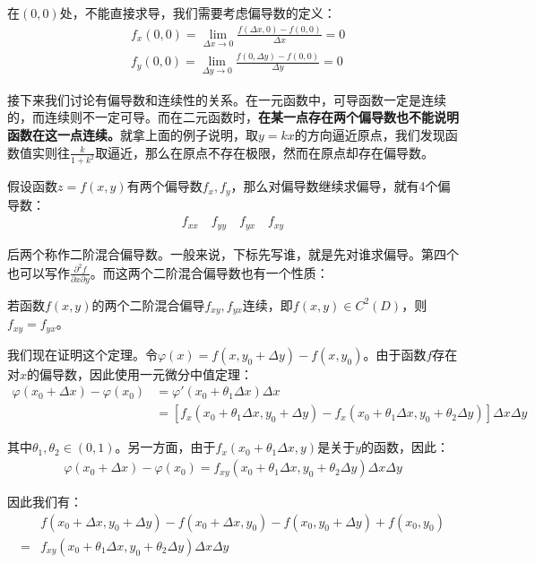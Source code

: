 \documentclass{ctexart}
\let\oldtextbf\textbf %
\renewcommand{\textbf}[1]{\textcolor{btex}{\oldtextbf{#1}}} %
\begin{document}
在$(0,0)$处，不能直接求导，我们需要考虑偏导数的定义：
\begin{align*}
    &f_x(0,0)=\lim_{\Delta x\to 0}\frac{f(\Delta x,0)-f(0,0)}{\Delta x}=0\\
    &f_y(0,0)=\lim_{\Delta y\to 0}\frac{f(0,\Delta y)-f(0,0)}{\Delta y}=0
\end{align*}

接下来我们讨论有偏导数和连续性的关系。在一元函数中，可导函数一定是连续的，而连续则不一定可导。而在二元函数时，\textbf{在某一点存在两个偏导数也不能说明函数在这一点连续。}就拿上面的例子说明，取$y=kx$的方向逼近原点，我们发现函数值实则往$\frac{k}{1+k^2}$取逼近，那么在原点不存在极限，然而在原点却存在偏导数。

假设函数$z=f(x,y)$有两个偏导数$f_x,f_y$，那么对偏导数继续求偏导，就有4个偏导数：
\begin{align*}
    f_{xx}\quad f_{yy}\quad f_{yx}\quad f_{xy}
\end{align*}

后两个称作二阶混合偏导数。一般来说，下标先写谁，就是先对谁求偏导。第四个也可以写作$\frac{\partial^2 f}{\partial x\partial y}$。而这两个二阶混合偏导数也有一个性质：
\begin{tcolorbox}[
    colback=bac1,     %
    colframe=fra1,   %
    coltitle=white,             %
    coltext=tex1,
    title=二阶混合偏导数的性质,
    fonttitle=\bfseries,        %
arc=3mm,                     %
breakable
]
若函数$f(x,y)$的两个二阶混合偏导$f_{xy},f_{yx}$连续，即$f(x,y)\in C^2(D)$，则$f_{xy}=f_{yx}$。
\end{tcolorbox}

我们现在证明这个定理。令$\varphi(x)=f(x,y_0+\Delta y)-f(x,y_0)$。由于函数$f$存在对$x$的偏导数，因此使用一元微分中值定理：
\begin{align*}
    \varphi(x_0+\Delta x)-\varphi(x_0)&=\varphi'(x_0+\theta_1 \Delta x)\Delta x\\
    &=[f_x(x_0+\theta_1 \Delta x,y_0+\Delta y)-f_x(x_0+\theta_1\Delta x,y_0+\theta_2\Delta y)]\Delta x\Delta y
\end{align*}

其中$\theta_1,\theta_2\in(0,1)$。另一方面，由于$f_x(x_0+\theta_1\Delta x,y)$是关于$y$的函数，因此：
\begin{align*}
     \varphi(x_0+\Delta x)-\varphi(x_0)=f_{xy}(x_0+\theta_1\Delta x,y_0+\theta_2\Delta y)\Delta x\Delta y
\end{align*}

因此我们有：
\begin{align*}
  &f(x_0+\Delta x,y_0+\Delta y)-f(x_0+\Delta x,y_0)-f(x_0,y_0+\Delta y)+f(x_0, y_0)
    \\=&f_{xy}(x_0+\theta_1\Delta x,y_0+\theta_2\Delta y)\Delta x\Delta y
\end{align*}
\end{document}
